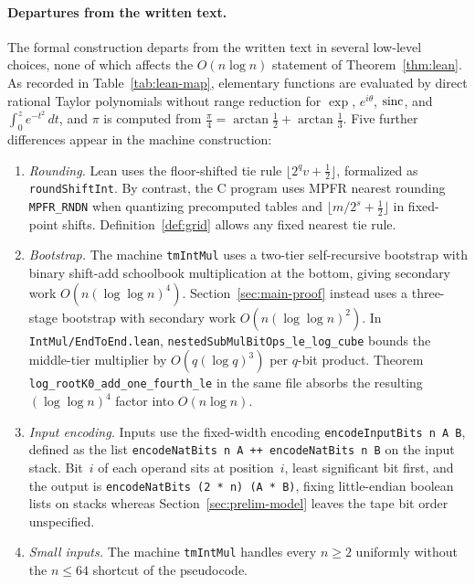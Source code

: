 \paragraph{Departures from the written text.}
The formal construction departs from the written text in several low-level choices, none of which affects the $O(n \log n)$ statement of Theorem~\ref{thm:lean}. As recorded in Table~\ref{tab:lean-map}, elementary functions are evaluated by direct rational Taylor polynomials without range reduction for $\exp$, $e^{i\theta}$, $\operatorname{sinc}$, and $\int_0^z e^{-t^2}\,dt$, and $\pi$ is computed from $\frac{\pi}{4} = \arctan\tfrac{1}{2} + \arctan\tfrac{1}{3}$. Five further differences appear in the machine construction:
\begin{enumerate}[label=(\arabic*),leftmargin=*]
\item \emph{Rounding.} Lean uses the floor-shifted tie rule $\lfloor 2^q v + \frac{1}{2}\rfloor$, formalized as \texttt{roundShiftInt}. By contrast, the C program uses MPFR nearest rounding \texttt{MPFR\_\allowbreak RNDN} when quantizing precomputed tables and $\lfloor m/2^s + \frac{1}{2}\rfloor$ in fixed-point shifts. Definition~\ref{def:grid} allows any fixed nearest tie rule.

\item \emph{Bootstrap.} The machine \texttt{tmIntMul} uses a two-tier self-recursive bootstrap with binary shift-add schoolbook multiplication at the bottom, giving secondary work $O(n(\log\log n)^4)$. Section~\ref{sec:main-proof} instead uses a three-stage bootstrap with secondary work $O(n(\log\log n)^2)$. In \texttt{IntMul/\allowbreak EndToEnd.lean}, \texttt{nestedSubMul\allowbreak BitOps\_\allowbreak le\_\allowbreak log\_\allowbreak cube} bounds the middle-tier multiplier by $O(q(\log q)^3)$ per $q$-bit product. Theorem \texttt{log\_\allowbreak rootK0\_\allowbreak add\_\allowbreak one\_\allowbreak fourth\_\allowbreak le} in the same file absorbs the resulting $(\log\log n)^4$ factor into $O(n \log n)$.

\item \emph{Input encoding.} Inputs use the fixed-width encoding \texttt{encodeInputBits n A B}, defined as the list \texttt{encodeNatBits n A ++ encodeNatBits n B} on the input stack. Bit~$i$ of each operand sits at position~$i$, least significant bit first, and the output is \texttt{encodeNatBits (2 * n) (A * B)}, fixing little-endian boolean lists on stacks whereas Section~\ref{sec:prelim-model} leaves the tape bit order unspecified.

\item \emph{Small inputs.} The machine \texttt{tmIntMul} handles every $n \ge 2$ uniformly without the $n \le 64$ shortcut of the pseudocode.


\end{enumerate}
